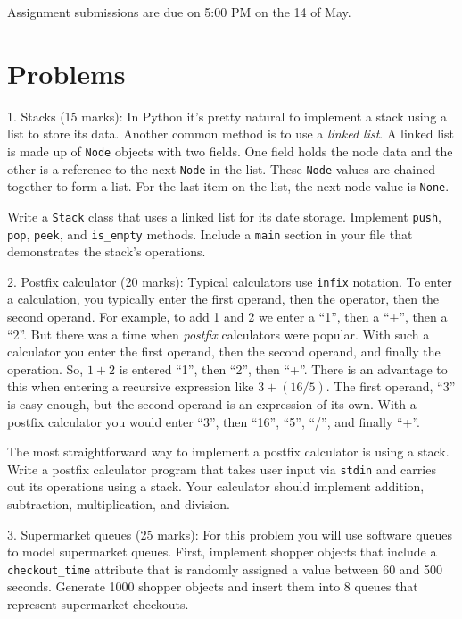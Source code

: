 \documentclass{article}
\begin{document}
Assignment submissions are due on 5:00 PM on the 14 of May.

\section*{Problems}

1. Stacks (15 marks): In Python it's pretty natural to implement a stack using a list to store its data. Another common method is to use a \emph{linked list}. A linked list is made up of \texttt{Node} objects with two fields. One field holds the node data and the other is a reference to the next \texttt{Node} in the list. These \texttt{Node} values are chained together to form a list. For the last item on the list, the next node value is \texttt{None}.

Write a \texttt{Stack} class that uses a linked list for its date storage. Implement \texttt{push}, \texttt{pop}, \texttt{peek}, and \texttt{is\_empty} methods. Include a \texttt{main} section in your file that demonstrates the stack's operations.

\vspace{3mm}
2. Postfix calculator (20 marks): Typical calculators use \texttt{infix} notation. To enter a calculation, you typically enter the first operand, then the operator, then the second operand. For example, to add 1 and 2 we enter a ``1'', then a ``+'', then a ``2''. But there was a time when \emph{postfix} calculators were popular. With such a calculator you enter the first operand, then the second operand, and finally the operation. So, $1 + 2$ is entered ``1'', then ``2'', then ``+''. There is an advantage to this when entering a recursive expression like $3 + (16 / 5)$. The first operand, ``3'' is easy enough, but the second operand is an expression of its own. With a postfix calculator you would enter ``3'', then ``16'', ``5'', ``/'', and finally ``+''.

The most straightforward way to implement a postfix calculator is using a stack. Write a postfix calculator program that takes user input via \texttt{stdin} and carries out its operations using a stack. Your calculator should implement addition, subtraction, multiplication, and division.

\vspace{3mm}
3. Supermarket queues (25 marks): For this problem you will use software queues to model supermarket queues. First, implement shopper objects that include a \texttt{checkout\_time} attribute that is randomly assigned a value between 60 and 500 seconds. Generate 1000 shopper objects and insert them into 8 queues that represent supermarket checkouts.
\end{document}
